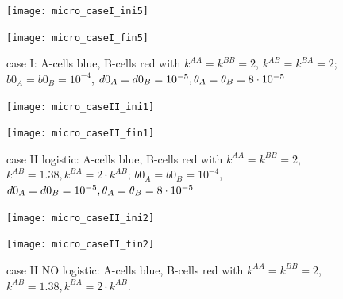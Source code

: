 \begin{figure}[htb]
	\begin{minipage}[t]{.45\textwidth}
		\centering
		\texttt{[image: micro\_caseI\_ini5]}
	\end{minipage}
	\hfill
	\begin{minipage}[t]{.45\textwidth}
		\centering
		\texttt{[image: micro\_caseI\_fin5]}
	\end{minipage}  
	\label{fig:1-2}
	\caption{{case I: A-cells blue, B-cells red with $k^{AA}=k^{BB}=2 $, $k^{AB}=k^{BA}=2$; $b0_A=b0_B=10^{-4}$, $d0_A=d0_B=10^{-5}, {\theta}_A={\theta}_B=8\cdot 10^{-5}$}}
\end{figure}



\begin{figure}[htb]
	\begin{minipage}[t]{.45\textwidth}
		\centering
		\texttt{[image: micro\_caseII\_ini1]}
	\end{minipage}
	\hfill
	\begin{minipage}[t]{.45\textwidth}
		\centering
		\texttt{[image: micro\_caseII\_fin1]}
	\end{minipage}  
	\label{fig:1-2}
	\caption{{case II logistic: A-cells blue, B-cells red with $k^{AA}=k^{BB}=2 $, $k^{AB}=1.38, k^{BA}=2\cdot k^{AB}$; $b0_A=b0_B=10^{-4}$, $d0_A=d0_B=10^{-5}, {\theta}_A={\theta}_B=8\cdot 10^{-5}$}}
\end{figure}


\begin{figure}[htb]
	\begin{minipage}[t]{.45\textwidth}
		\centering
		\texttt{[image: micro\_caseII\_ini2]}
	\end{minipage}
	\hfill
	\begin{minipage}[t]{.45\textwidth}
		\centering
		\texttt{[image: micro\_caseII\_fin2]}
	\end{minipage}  
	\label{fig:1-2}
	\caption{{case II NO logistic: A-cells blue, B-cells red with $k^{AA}=k^{BB}=2 $, $k^{AB}=1.38, k^{BA}=2\cdot k^{AB}$.}}
\end{figure}


